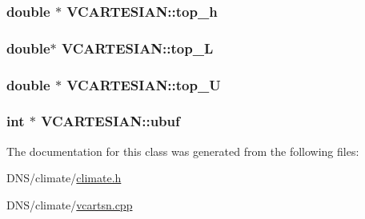 \subsubsection[{\texorpdfstring{top\+\_\+h}{top_h}}]{\setlength{\rightskip}{0pt plus 5cm}double $\ast$ V\+C\+A\+R\+T\+E\+S\+I\+A\+N\+::top\+\_\+h}\hypertarget{class_v_c_a_r_t_e_s_i_a_n_a539ebf9e799de967bfe82da7ec444318}{}\label{class_v_c_a_r_t_e_s_i_a_n_a539ebf9e799de967bfe82da7ec444318}
\subsubsection[{\texorpdfstring{top\+\_\+L}{top_L}}]{\setlength{\rightskip}{0pt plus 5cm}double$\ast$ V\+C\+A\+R\+T\+E\+S\+I\+A\+N\+::top\+\_\+L}\hypertarget{class_v_c_a_r_t_e_s_i_a_n_ab24253e61a340a4e101a0ad1e5c4e4f6}{}\label{class_v_c_a_r_t_e_s_i_a_n_ab24253e61a340a4e101a0ad1e5c4e4f6}
\subsubsection[{\texorpdfstring{top\+\_\+U}{top_U}}]{\setlength{\rightskip}{0pt plus 5cm}double $\ast$ V\+C\+A\+R\+T\+E\+S\+I\+A\+N\+::top\+\_\+U}\hypertarget{class_v_c_a_r_t_e_s_i_a_n_a4e846ec8b7509e1fd52948680822c5f2}{}\label{class_v_c_a_r_t_e_s_i_a_n_a4e846ec8b7509e1fd52948680822c5f2}
\subsubsection[{\texorpdfstring{ubuf}{ubuf}}]{\setlength{\rightskip}{0pt plus 5cm}int $\ast$ V\+C\+A\+R\+T\+E\+S\+I\+A\+N\+::ubuf}\hypertarget{class_v_c_a_r_t_e_s_i_a_n_a5fc6731ea8cfb532140a54f96f66490a}{}\label{class_v_c_a_r_t_e_s_i_a_n_a5fc6731ea8cfb532140a54f96f66490a}


The documentation for this class was generated from the following files\+:\begin{DoxyCompactItemize}
\item 
D\+N\+S/climate/\hyperlink{climate_8h}{climate.\+h}\item 
D\+N\+S/climate/\hyperlink{vcartsn_8cpp}{vcartsn.\+cpp}\end{DoxyCompactItemize}
